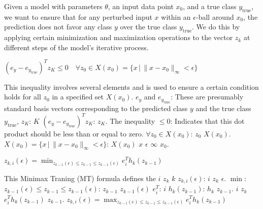 Given a model with parameters $\theta$, an input data point $x_0$, and a true class $y_{\text{true}}$, we want to ensure that for any perturbed input $x$ within an $\epsilon$-ball around $x_0$, the prediction does not favor any class $y$ over the true class $y_{\text{true}}$. We do this by applying certain minimization and maximization operations to the vector $z_k$ at different steps of the model's iterative process.


$(e_y - e_{y_{\text{true}}})^T z_K \leq 0 \quad \forall z_0 \in X(x_0) = \{x \,|\, \|x - x_0\|_{\infty} < \epsilon\}$

This inequality involves several elements and is used to ensure a certain condition holds for all  $z_0$ in a specified set $X(x_0)$. 
$e_y$ and $e_{y_{\text{true}}}$: These are presumably standard basis vectors corresponding to the predicted class $y$ and the true class $y_{\text{true}}$, $z_K$:  $K$ 
$(e_y - e_{y_{\text{true}}})^T z_K$:  $z_K$.
The inequality $\leq 0$: Indicates that this dot product should be less than or equal to zero.
$\forall z_0 \in X(x_0)$:  $z_0$  $X(x_0)$.
$X(x_0) = \{x \,|\, \|x - x_0\|_{\infty} < \epsilon\}$:  $X(x_0)$  $x$  $\epsilon$  $\infty$  $x_0$.

$z_{k,i}(\epsilon) = \min_{z_{k-1}(\epsilon) \leq z_{k-1} \leq z_{k-1}(\epsilon)} e^T_i h_k(z_{k-1})$

This Minimax Traning (MT) formula defines the $i$  $z_k$  $k$ 
$z_{k,i}(\epsilon)$:  $i$  $z_k$  $\epsilon$.
$\min$: 
$z_{k-1}(\epsilon) \leq z_{k-1} \leq z_{k-1}(\epsilon)$:  $z_{k-1}$  $z_{k-1}(\epsilon)$ 
$e^T_i$:  $i$ 
$h_k(z_{k-1})$:  $h_k$  $z_{k-1}$.
 $i$  $z_k$  $e^T_i h_k(z_{k-1})$  $z_{k-1}$.
$z_{k,i}(\epsilon) = \max_{z_{k-1}(\epsilon) \leq z_{k-1} \leq z_{k-1}(\epsilon)} e^T_i h_k(z_{k-1})$

